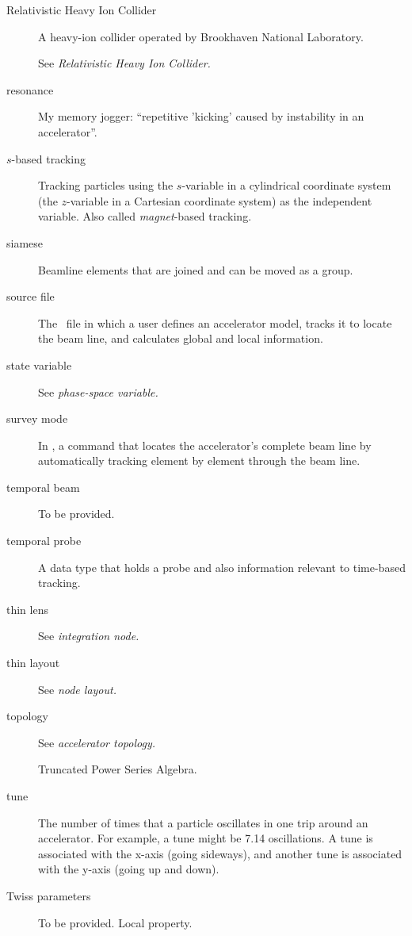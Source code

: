 \begin{description}
  \item[Relativistic Heavy Ion Collider]
A heavy-ion collider operated by Brookhaven National Laboratory.

  \item[{}]
See \emph{Relativistic Heavy Ion Collider.}

  \item[resonance]
My memory jogger: ``repetitive 'kicking' caused by instability
in an accelerator''.

  \item[$s$-based tracking]
Tracking particles using the $s$-variable in a cylindrical coordinate system
(the $z$-variable in a Cartesian coordinate system) as the independent variable.
Also called \emph{magnet}-based tracking.

  \item[siamese]
Beamline elements that are joined and can be moved as a group.

  \item[source file]
The \PTC\ file in which a user defines an accelerator model, tracks
it to locate the beam line, and calculates global and local information.

  \item[state variable]
See \emph{phase-space variable.}

  \item[survey mode]
In \PTC, a command that locates the accelerator's complete beam line
by automatically tracking element by element through the beam line.

  \item[temporal beam]
To be provided.

  \item[temporal probe]
A data type that holds a probe and also information relevant to time-based tracking.

  \item[thin lens]
See \emph{integration node.}

  \item[thin layout]
See \emph{node layout.}

  \item[topology]
See \emph{accelerator topology.}

  \item[{}]
Truncated Power Series Algebra.

  \item[tune]
The number of times that a particle oscillates in one trip around
an accelerator. For example, a tune might be 7.14 oscillations. A tune
is associated with the x-axis (going sideways), and another tune is
associated with the y-axis (going up and down).

  \item[Twiss parameters]
To be provided. Local property.
\end{description}

\endinput
